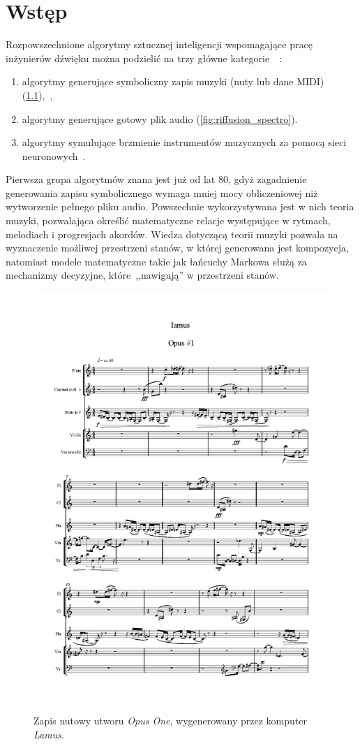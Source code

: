 \chapter{Wstęp}

Rozpowszechnione algorytmy sztucznej inteligencji wspomagające pracę inżynierów dźwięku można podzielić na trzy główne kategorie~\cite{analysis_generative}~\label{traditional_algos}:

\begin{enumerate}
    \item algorytmy generujące symboliczny zapis muzyki (nuty lub dane MIDI) (\ref{fig:lamus_notes}),~\cite{zhang2023language},
    \item algorytmy generujące gotowy plik audio (\ref{fig:riffusion_spectro}).
    \item algorytmy symulujące brzmienie instrumentów muzycznych za pomocą sieci neuronowych~\cite{engel2017neural}.
\end{enumerate}

Pierwsza grupa algorytmów znana jest już od lat 80, gdyż zagadnienie generowania zapisu symbolicznego wymaga mniej mocy obliczeniowej niż wytworzenie pełnego pliku audio.
Powszechnie wykorzystywana jest w nich teoria muzyki, pozwalająca określić matematyczne relacje występujące w rytmach, melodiach i progresjach akordów.
Wiedza dotyczącą teorii muzyki pozwala na wyznaczenie możliwej przestrzeni stanów, w której generowana jest kompozycja,
natomiast modele matematyczne takie jak łańcuchy Markowa służą za mechanizmy decyzyjne, które~,,nawigują'' w przestrzeni stanów.

\begin{figure}[H]\label{fig:lamus_notes}
    \centering
    \includegraphics[width=0.4\linewidth]{rys01/lamus_notes.jpg}
    \caption{Zapis nutowy utworu \textit{Opus One}, wygenerowany przez komputer \textit{Lamus}.}
\end{figure}

